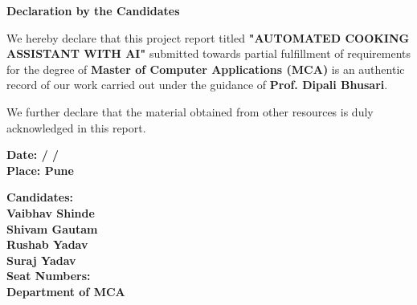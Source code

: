 \thispagestyle{empty} %

\begin{center}
    \vspace*{1.8cm}
    {\LARGE \textbf{Declaration by the Candidates}}\\[1.5cm]
\end{center}

\linespread{1.5} %
\large
We hereby declare that this project report titled \textbf{"AUTOMATED COOKING ASSISTANT WITH AI"} submitted towards partial fulfillment of requirements for the degree of \textbf{Master of Computer Applications (MCA)} is an authentic record of our work carried out under the guidance of \textbf{Prof. Dipali Bhusari}.

\vspace{0.5cm}
We further declare that the material obtained from other resources is duly acknowledged in this report.

\vspace{1.5cm}

\noindent \textbf{Date: \hspace{0.5cm} / \hspace{0.5cm} /} \\
\textbf{Place: Pune}

\vspace{-1cm} %

\begin{flushright}
    \begin{minipage}{0.45\textwidth}
        \textbf{Candidates:}\\[0.5cm]
        \textbf{Vaibhav  Shinde}\\
        \textbf{Shivam Gautam}\\
        \textbf{Rushab Yadav}\\
        \textbf{Suraj Yadav}\\[0.8cm]
        \textbf{Seat Numbers: \hrulefill}\\
        \textbf{Department of MCA}
    \end{minipage}
\end{flushright}